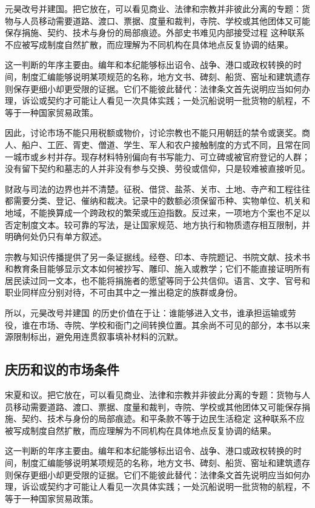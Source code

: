 元昊改号并建国。把它放在，可以看见商业、法律和宗教并非彼此分离的专题：货物与人员移动需要道路、渡口、票据、度量和裁判，寺院、学校或其他团体又可能保存捐施、契约、技术与身份的局部痕迹。外部史书难见内部接受过程 这种联系不应被写成制度自然扩散，而应理解为不同机构在具体地点反复协调的结果。

这一判断的年序主要由。编年和本纪能够标出诏令、战争、港口或政权转换的时间，制度汇编能够说明某项规范的名称，地方文书、碑刻、船货、窑址和建筑遗存则保存更细小却更受限的证据。它们不能彼此替代：法律条文首先说明应当如何办理，诉讼或契约才可能让人看见一次具体实践；一处沉船说明一批货物的航程，不等于一种国家贸易政策。

因此，讨论市场不能只用税额或物价，讨论宗教也不能只用朝廷的禁令或褒奖。商人、船户、工匠、胥吏、僧道、学生、军人和农户接触制度的方式不同，且常在同一城市或乡村并存。现存材料特别偏向有书写能力、可立碑或被官府登记的人群；没有留下契约和墓志的人并非没有参与交换、劳役或信仰，只是较难被直接听见。

财政与司法的边界也并不清楚。征税、借贷、盐茶、关市、土地、寺产和工程往往都需要分类、登记、催纳和裁决。记录中的数额必须保留币种、实物单位、机关和地域，不能换算成一个跨政权的繁荣或压迫指数。反过来，一项地方个案也不足以否定制度文本。较可靠的写法，是让国家规范、地方执行和物质遗存相互限制，并明确何处仍只有单方叙述。

宗教与知识传播提供了另一条证据线。经卷、印本、寺院题记、书院文献、技术书和教育条目能够显示文本如何被抄写、雕印、施入或教学；它们不能直接证明所有居民读过同一文本，也不能将捐施者的愿望等同于公共信仰。语言、文字、官号和职业同样应分别对待，不可由其中之一推出稳定的族群或身份。

所以，元昊改号并建国 的历史价值在于让：谁能够进入文书，谁承担运输或劳役，谁在市场、寺院、学校和衙门之间转换位置。其余尚不可见的部分，本书以来源限制标出，避免用连贯叙事填补材料的沉默。

\subsection{庆历和议的市场条件}

宋夏和议。把它放在，可以看见商业、法律和宗教并非彼此分离的专题：货物与人员移动需要道路、渡口、票据、度量和裁判，寺院、学校或其他团体又可能保存捐施、契约、技术与身份的局部痕迹。和平条款不等于边民生活稳定 这种联系不应被写成制度自然扩散，而应理解为不同机构在具体地点反复协调的结果。

这一判断的年序主要由。编年和本纪能够标出诏令、战争、港口或政权转换的时间，制度汇编能够说明某项规范的名称，地方文书、碑刻、船货、窑址和建筑遗存则保存更细小却更受限的证据。它们不能彼此替代：法律条文首先说明应当如何办理，诉讼或契约才可能让人看见一次具体实践；一处沉船说明一批货物的航程，不等于一种国家贸易政策。

